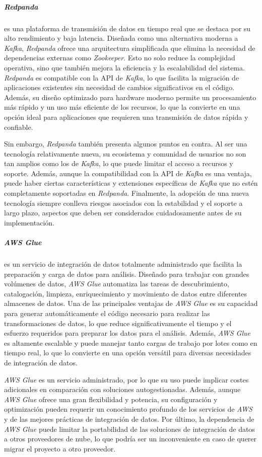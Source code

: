 \subparagraph{Redpanda} es una plataforma de transmisión de datos en tiempo real
que se destaca por su alto rendimiento y baja latencia. Diseñada como una
alternativa moderna a \textit{Kafka}, \textit{Redpanda} ofrece una arquitectura
simplificada que elimina la necesidad de dependencias externas como
\textit{Zookeeper}. Esto no solo reduce la complejidad operativa, sino que
también mejora la eficiencia y la escalabilidad del sistema. \textit{Redpanda}
es compatible con la API de \textit{Kafka}, lo que facilita la migración de
aplicaciones existentes sin necesidad de cambios significativos en el código.
Además, su diseño optimizado para hardware moderno permite un procesamiento más
rápido y un uso más eficiente de los recursos, lo que la convierte en una opción
ideal para aplicaciones que requieren una transmisión de datos rápida y
confiable.

Sin embargo, \textit{Redpanda} también presenta algunos puntos en contra. Al ser
una tecnología relativamente nueva, su ecosistema y comunidad de usuarios no son
tan amplios como los de \textit{Kafka}, lo que puede limitar el acceso a
recursos y soporte. Además, aunque la compatibilidad con la API de
\textit{Kafka} es una ventaja, puede haber ciertas características y extensiones
específicas de \textit{Kafka} que no estén completamente soportadas en
\textit{Redpanda}. Finalmente, la adopción de una nueva tecnología siempre
conlleva riesgos asociados con la estabilidad y el soporte a largo plazo,
aspectos que deben ser considerados cuidadosamente antes de su implementación.


\subparagraph{AWS Glue} es un servicio de integración de datos totalmente
administrado que facilita la preparación y carga de datos para análisis.
Diseñado para trabajar con grandes volúmenes de datos, \textit{AWS Glue}
automatiza las tareas de descubrimiento, catalogación, limpieza, enriquecimiento
y movimiento de datos entre diferentes almacenes de datos. Una de las
principales ventajas de \textit{AWS Glue} es su capacidad para generar
automáticamente el código necesario para realizar las transformaciones de datos,
lo que reduce significativamente el tiempo y el esfuerzo requeridos para
preparar los datos para el análisis. Además, \textit{AWS Glue} es altamente
escalable y puede manejar tanto cargas de trabajo por lotes como en tiempo real,
lo que lo convierte en una opción versátil para diversas necesidades de
integración de datos.

\textit{AWS Glue} es un servicio administrado, por lo que su uso puede implicar
costes adicionales en comparación con soluciones autogestionadas. Además, aunque
\textit{AWS Glue} ofrece una gran flexibilidad y potencia, su configuración y
optimización pueden requerir un conocimiento profundo de los servicios de
\textit{AWS} y de las mejores prácticas de integración de datos. Por último, la
dependencia de \textit{AWS Glue} puede limitar la portabilidad de las soluciones
de integración de datos a otros proveedores de nube, lo que podría ser un
inconveniente en caso de querer migrar el proyecto a otro proveedor.


